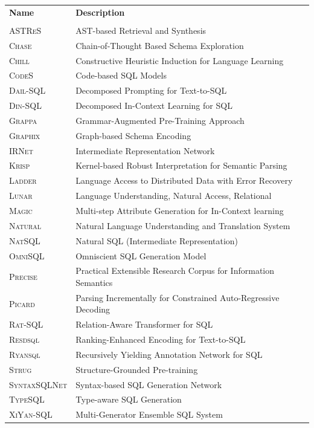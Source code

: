 \begin{tabular}{ll}

\textbf{Name} & \textbf{Description} \\
\\
\textsc{ASTReS}       & AST-based Retrieval and Synthesis \\
\textsc{Chase}        & Chain-of-Thought Based Schema Exploration \\
\textsc{Chill}        & Constructive Heuristic Induction for Language Learning \\
\textsc{CodeS}        & Code-based SQL Models \\
\textsc{Dail-SQL}     & Decomposed Prompting for Text-to-SQL \\
\textsc{Din-SQL}      & Decomposed In-Context Learning for SQL \\
\textsc{Grappa}       & Grammar-Augmented Pre-Training Approach \\
\textsc{Graphix}      & Graph-based Schema Encoding \\
\textsc{IRNet}        & Intermediate Representation Network \\
\textsc{Krisp}        & Kernel-based Robust Interpretation for Semantic Parsing \\
\textsc{Ladder}       & Language Access to Distributed Data with Error Recovery \\
\textsc{Lunar}        & Language Understanding, Natural Access, Relational \\
\textsc{Magic}        & Multi-step Attribute Generation for In-Context learning \\
\textsc{Natural}      & Natural Language Understanding and Translation System \\
\textsc{NatSQL}       & Natural SQL (Intermediate Representation) \\
\textsc{OmniSQL}      & Omniscient SQL Generation Model \\
\textsc{Precise}      & Practical Extensible Research Corpus for Information Semantics \\
\textsc{Picard}       & Parsing Incrementally for Constrained Auto-Regressive Decoding \\
\textsc{Rat-SQL}      & Relation-Aware Transformer for SQL \\
\textsc{Resdsql}      & Ranking-Enhanced Encoding for Text-to-SQL \\
\textsc{Ryansql}      & Recursively Yielding Annotation Network for SQL \\
\textsc{Strug}        & Structure-Grounded Pre-training \\
\textsc{SyntaxSQLNet} & Syntax-based SQL Generation Network \\
\textsc{TypeSQL}      & Type-aware SQL Generation \\
\textsc{XiYan-SQL}    & Multi-Generator Ensemble SQL System \\
\end{tabular}

